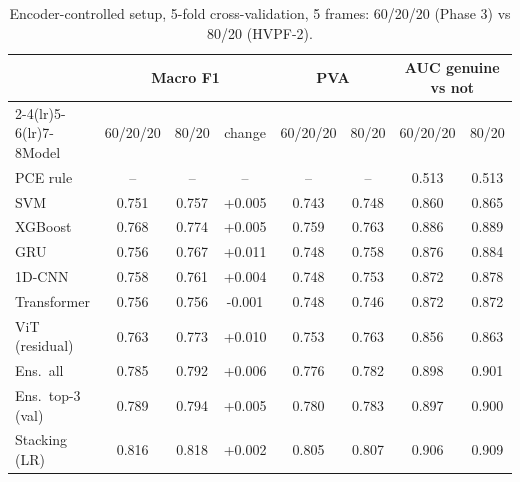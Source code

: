 \documentclass[11pt,a4paper]{article}
\begin{document}
\begin{table}[H]\centering\small\caption{Encoder-controlled setup, 5-fold cross-validation, 5 frames: 60/20/20 (Phase 3) vs 80/20 (HVPF-2).}\begin{tabular}{lccccccc}\toprule & \multicolumn{3}{c}{Macro F1} & \multicolumn{2}{c}{PVA} & \multicolumn{2}{c}{AUC genuine vs not} \\\cmidrule(lr){2-4}\cmidrule(lr){5-6}\cmidrule(lr){7-8}Model & 60/20/20 & 80/20 & change & 60/20/20 & 80/20 & 60/20/20 & 80/20 \\\midrule
PCE rule & -- & -- & -- & -- & -- & 0.513 & 0.513 \\
SVM & 0.751 & 0.757 & +0.005 & 0.743 & 0.748 & 0.860 & 0.865 \\
XGBoost & 0.768 & 0.774 & +0.005 & 0.759 & 0.763 & 0.886 & 0.889 \\
GRU & 0.756 & 0.767 & +0.011 & 0.748 & 0.758 & 0.876 & 0.884 \\
1D-CNN & 0.758 & 0.761 & +0.004 & 0.748 & 0.753 & 0.872 & 0.878 \\
Transformer & 0.756 & 0.756 & -0.001 & 0.748 & 0.746 & 0.872 & 0.872 \\
ViT (residual) & 0.763 & 0.773 & +0.010 & 0.753 & 0.763 & 0.856 & 0.863 \\
Ens.\ all & 0.785 & 0.792 & +0.006 & 0.776 & 0.782 & 0.898 & 0.901 \\
Ens.\ top-3 (val) & 0.789 & 0.794 & +0.005 & 0.780 & 0.783 & 0.897 & 0.900 \\
Stacking (LR) & 0.816 & 0.818 & +0.002 & 0.805 & 0.807 & 0.906 & 0.909 \\
\bottomrule\end{tabular}\end{table}
\end{document}
